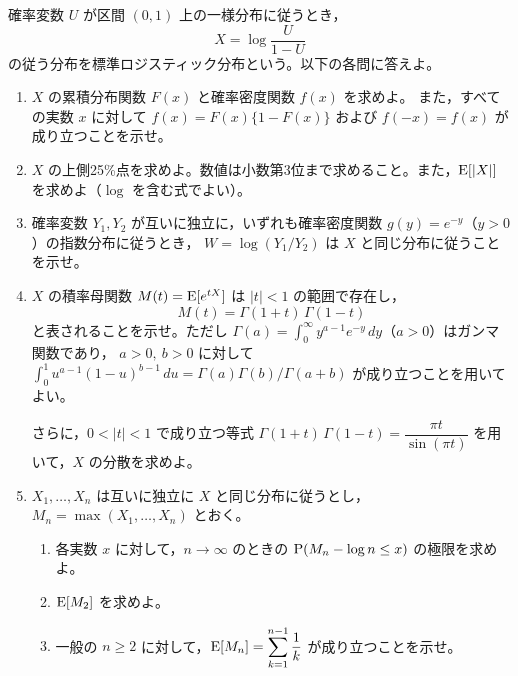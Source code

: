 \documentclass[a4paper,11pt]{ltjsarticle}
\begin{document}
確率変数 $U$ が区間 $(0,1)$ 上の一様分布に従うとき，
\[
X=\log\frac{U}{1-U}
\]
の従う分布を標準ロジスティック分布という。以下の各問に答えよ。
\begin{enumerate}
\item $X$ の累積分布関数 $F(x)$ と確率密度関数 $f(x)$ を求めよ。
また，すべての実数 $x$ に対して $f(x)=F(x)\{1-F(x)\}$ および $f(-x)=f(x)$ が成り立つことを示せ。
\item $X$ の上側25\%点を求めよ。数値は小数第3位まで求めること。また，$\operatorname{E}[|X|]$ を求めよ（$\log$ を含む式でよい）。
\item 確率変数 $Y_1,Y_2$ が互いに独立に，いずれも確率密度関数 $g(y)=e^{-y}$（$y>0$）の指数分布に従うとき，
$W=\log(Y_1/Y_2)$ は $X$ と同じ分布に従うことを示せ。
\item $X$ の積率母関数 $M(t)=\operatorname{E}[e^{tX}]$ は $|t|<1$ の範囲で存在し，
\[
M(t)=\Gamma(1+t)\,\Gamma(1-t)
\]
と表されることを示せ。ただし $\Gamma(a)=\int_0^\infty y^{a-1}e^{-y}\,dy$（$a>0$）はガンマ関数であり，
$a>0,\ b>0$ に対して $\int_0^1u^{a-1}(1-u)^{b-1}\,du=\Gamma(a)\Gamma(b)/\Gamma(a+b)$ が成り立つことを用いてよい。

さらに，$0<|t|<1$ で成り立つ等式 $\Gamma(1+t)\,\Gamma(1-t)=\dfrac{\pi t}{\sin(\pi t)}$ を用いて，$X$ の分散を求めよ。
\item $X_1,\ldots,X_n$ は互いに独立に $X$ と同じ分布に従うとし，$M_n=\max(X_1,\ldots,X_n)$ とおく。
\begin{enumerate}[label=(\alph*),leftmargin=2em,itemsep=0.3em,topsep=0.3em]
\item 各実数 $x$ に対して，$n\to\infty$ のときの $\operatorname{P}(M_n-\log n\le x)$ の極限を求めよ。
\item $\operatorname{E}[M_2]$ を求めよ。
\item 一般の $n\ge2$ に対して，$\operatorname{E}[M_n]=\displaystyle\sum_{k=1}^{n-1}\frac1k$ が成り立つことを示せ。
\end{enumerate}
\end{enumerate}
\newpage
\end{document}

